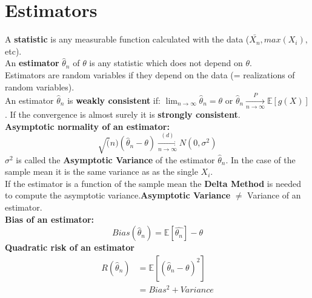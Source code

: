 \section{Estimators}

A \textbf{statistic} is any measurable function calculated with the data ($\bar{X_n}, max(X_i),$ etc).\\

An \textbf{estimator} $\hat{\theta }_ n$ of $\theta$ is any statistic which does not depend on $\theta$.\\

Estimators are random variables if they depend on the data (= realizations of random variables).\\

An estimator $\hat{\theta }_ n$ is \textbf{weakly consistent} if: $\displaystyle \lim _{n \to \infty } \hat{\theta }_ n = \theta$ or $ \hat{\theta}_n \xrightarrow[n \rightarrow \infty]{P} \mathbb{E}[g(X)]$. If the convergence is almost surely it is \textbf{strongly consistent}.\\
\textbf{Asymptotic normality of an estimator:}
\[\sqrt(n) (\hat{\theta}_n-\theta) \xrightarrow[n \rightarrow \infty]{(d)} N(0,\sigma^2)\]
$\sigma^2$ is called the \textbf{Asymptotic Variance} of the estimator $\hat{\theta}_n$. In the case of the sample mean it is the same variance as as the single $X_i$.\\
If the estimator is a function of the sample mean the \textbf{Delta Method} is needed to compute the asymptotic variance.\textbf{Asymptotic Variance} $\neq$ Variance of an estimator.\\
\textbf{Bias of an estimator:}
\[Bias(\hat{\theta}_n) = \mathbb{E}[\hat{\theta_n}] - \theta\]
\textbf{Quadratic risk of an estimator}
\begin{align*}
R(\hat{\theta}_n) & = \mathbb{E}[(\hat{\theta}_n-\theta)^2]\\
& = Bias^2 + Variance
\end{align*}
